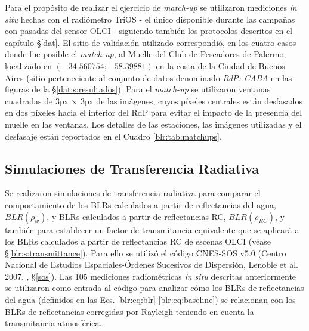         Para el propósito de realizar el ejercicio de \textit{match-up} se utilizaron mediciones \textit{in situ} hechas con el radiómetro TriOS - el único disponible durante las campañas con pasadas del sensor OLCI - siguiendo también los protocolos descritos en el capítulo \S \ref{dat}. El sitio de validación utilizado correspondió, en los cuatro casos donde fue posible el \textit{match-up}, al Muelle del Club de Pescadores de Palermo, localizado en $(-34.560754; -58.39881)$ en la costa de la Ciudad de Buenos Aires (sitio perteneciente al conjunto de datos denominado \textit{RdP: CABA} en las figuras de la \S \ref{dat:s:resultados}). Para el \textit{match-up} se utilizaron ventanas cuadradas de 3px $\times$ 3px de las imágenes, cuyos píxeles centrales están desfasados en dos píxeles hacia el interior del RdP para evitar el impacto de la presencia del muelle en las ventanas. Los detalles de las estaciones, las imágenes utilizadas y el desfasaje están reportados en el Cuadro \ref{blr:tab:matchups}.

    \subsection{Simulaciones de Transferencia Radiativa}
    \label{blr:s:simulations}
    
        Se realizaron simulaciones de transferencia radiativa para comparar el comportamiento de los BLRs calculados a partir de reflectancias del agua, $BLR(\rho_{w})$, y BLRs calculados a partir de reflectancias RC, $BLR (\rho_{RC})$, y también para establecer un factor de transmitancia equivalente que se aplicará a los BLRs calculados a partir de reflectancias RC de escenas OLCI (véase \S \ref{blr:s:transmittance}). Para ello se utilizó el código CNES-SOS v5.0 (Centro Nacional de Estudios Espaciales-Órdenes Sucesivos de Dispersión, Lenoble et al. 2007, \cite{lenoble2007}, \S \ref{sos}). Las 105 mediciones radiométricas \textit{in situ} descritas anteriormente se utilizaron como entrada al código para analizar cómo los BLRs de reflectancias del agua (definidos en las Ecs. \ref{blr:eq:blr}-\ref{blr:eq:baseline}) se relacionan con los BLRs de reflectancias corregidas por Rayleigh teniendo en cuenta la transmitancia atmosférica.
        
